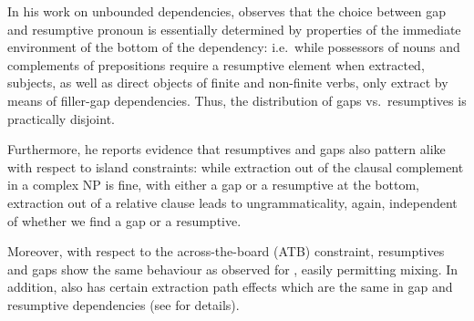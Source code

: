 \documentclass[output=paper
,notxmath 
	        ,collection
	        ,collectionchapter
 	        ,biblatex
                ,babelshorthands
                ,newtxmath
                ,draftmode
                ,colorlinks, citecolor=brown
]{langscibook}
\begin{document}
In his work on  unbounded dependencies,
\citet{Borsley.2010} observes that the choice between gap and
resumptive pronoun is essentially determined by properties of the
immediate environment of the bottom of the dependency: i.e.\ while
possessors of nouns and complements of prepositions require a
resumptive element when extracted, subjects, as well as direct objects
of finite and non-finite verbs, only extract by means of filler-gap
dependencies. Thus, the distribution of gaps vs.\ resumptives is
practically disjoint.

Furthermore, he reports evidence that resumptives and gaps also
pattern alike with respect to island constraints: while extraction out
of the clausal complement in a complex NP is fine, with either a gap
or a resumptive at the bottom, extraction out of a relative clause leads to
ungrammaticality, again, independent of whether we find a gap or a
resumptive.

\eal
{}
\zl

\noindent
Moreover, with respect to the across-the-board (ATB) constraint,
resumptives and gaps show the same behaviour as observed for ,
easily permitting mixing. In addition,  also has certain
extraction path effects which are the same in gap and resumptive
dependencies (see \citealp{Borsley.2010} for details).
\end{document}
